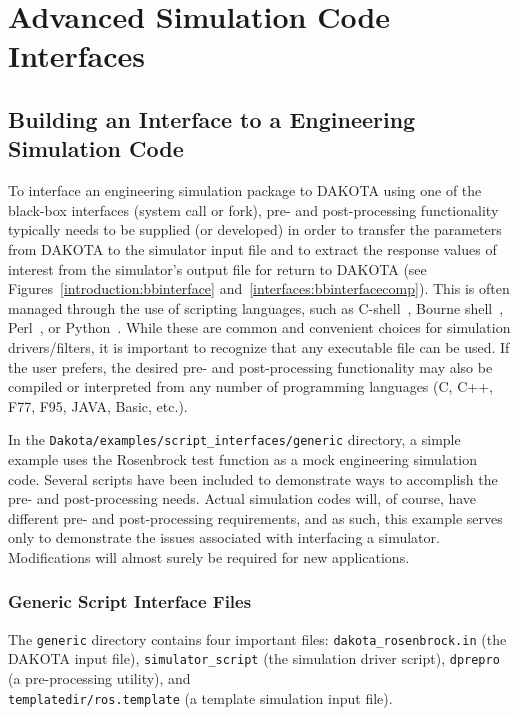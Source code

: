 \chapter{Advanced Simulation Code Interfaces}\label{advint}

\section{Building an Interface to a Engineering Simulation Code}\label{advint:building}

To interface an engineering simulation package to DAKOTA using one of
the black-box interfaces (system call or fork), pre- and
post-processing functionality typically needs to be supplied (or
developed) in order to transfer the parameters from DAKOTA to the
simulator input file and to extract the response values of interest
from the simulator's output file for return to DAKOTA (see
Figures~\ref{introduction:bbinterface}
and~\ref{interfaces:bbinterfacecomp}). This is often managed through
the use of scripting languages, such as C-shell~\cite{And86}, Bourne
shell~\cite{Bli96}, Perl~\cite{Wal96}, or Python~\cite{Mar03}. While
these are common and convenient choices for simulation
drivers/filters, it is important to recognize that any executable file
can be used. If the user prefers, the desired pre- and post-processing
functionality may also be compiled or interpreted from any number of
programming languages (C, C++, F77, F95, JAVA, Basic, etc.).

In the \texttt{Dakota/examples/script\_interfaces/generic} directory, a
simple example uses the Rosenbrock test function as a mock engineering
simulation code. Several scripts have been included to demonstrate
ways to accomplish the pre- and post-processing needs. Actual
simulation codes will, of course, have different pre- and
post-processing requirements, and as such, this example serves only to
demonstrate the issues associated with interfacing a
simulator. Modifications will almost surely be required for new
applications.

\subsection{Generic Script Interface Files} 

The {\tt generic} directory contains four important files:
\texttt{dakota\_rosenbrock.in} (the DAKOTA input file),
\texttt{simulator\_script} (the simulation driver script),
\texttt{dprepro} (a pre-processing utility), and \\
\texttt{templatedir/ros.template} (a template simulation input file).


